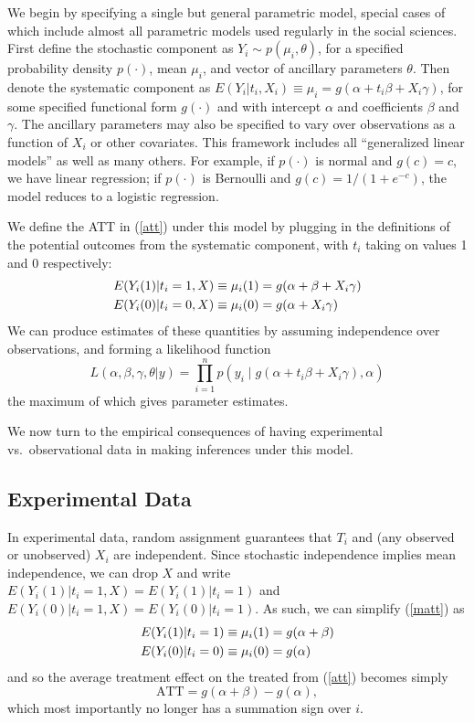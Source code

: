 \documentclass[11pt,titlepage]{article}
\begin{document}
We begin by specifying a single but general parametric model, special
cases of which include almost all parametric models used regularly in
the social sciences.  First define the stochastic component as $Y_i
\sim p(\mu_i,\theta)$, for a specified probability density $p(\cdot)$,
mean $\mu_i$, and vector of ancillary parameters $\theta$.  Then
denote the systematic component as $E(Y_i|t_i,X_i)\equiv\mu_i=g(\alpha
+ t_i\beta + X_i\gamma)$, for some specified functional form
$g(\cdot)$ and with intercept $\alpha$ and coefficients $\beta$ and
$\gamma$.  The ancillary parameters may also be specified to vary over
observations as a function of $X_i$ or other covariates.  This
framework includes all ``generalized linear models'' as well as many
others.  For example, if $p(\cdot)$ is normal and $g(c)=c$, we have
linear regression; if $p(\cdot)$ is Bernoulli and $g(c)=1/(1+e^{-c})$,
the model reduces to a logistic regression.

We define the ATT in (\ref{att}) under this model by plugging in the
definitions of the potential outcomes from the systematic component,
with $t_i$ taking on values 1 and 0 respectively:
\begin{align}
  \label{matt}
  E(Y_i(1)|t_i=1,X) &\equiv \mu_i(1) = g(\alpha + \beta + X_i\gamma)\notag \\
  E(Y_i(0)|t_i=0,X) &\equiv \mu_i(0) = g(\alpha + X_i\gamma)
\end{align}
We can produce estimates of these quantities by assuming independence
over observations, and forming a likelihood function
\begin{equation}
  \label{lik}
  L(\alpha,\beta,\gamma,\theta|y) = \prod_{i=1}^n 
  p\left(y_i \mid g(\alpha + t_i\beta + X_i\gamma), \alpha\right)
\end{equation}
the maximum of which gives parameter estimates.

We now turn to the empirical consequences of having experimental vs.\ 
observational data in making inferences under this model.

\subsection{Experimental Data}\label{s:paraexp}

In experimental data, random assignment guarantees that $T_i$ and (any
observed or unobserved) $X_i$ are independent.  Since stochastic
independence implies mean independence, we can drop $X$ and write
$E(Y_i(1)|t_i=1,X)=E(Y_i(1)|t_i=1)$ and
$E(Y_i(0)|t_i=1,X)=E(Y_i(0)|t_i=1)$.  As such, we can simplify
(\ref{matt}) as
\begin{align}
  \label{smatt}
  E(Y_i(1)|t_i=1) &\equiv \mu_i(1) = g(\alpha + \beta)\notag \\
  E(Y_i(0)|t_i=0) &\equiv \mu_i(0) = g(\alpha)
\end{align}
and so the average treatment effect on the treated from (\ref{att})
becomes simply
\begin{equation}
  \label{satt}
  \text{ATT} = g(\alpha+\beta) - g(\alpha),
\end{equation}
which most importantly no longer has a summation sign over $i$.
\end{document}
